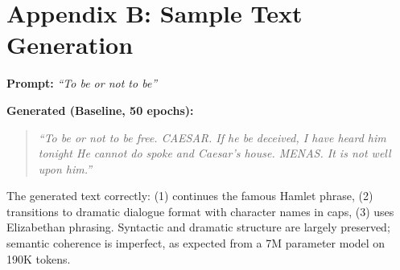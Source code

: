 \documentclass[12pt,a4paper]{article}
\begin{document}
\section*{Appendix B: Sample Text Generation}

\textbf{Prompt:} \textit{``To be or not to be''}

\textbf{Generated (Baseline, 50 epochs):}
\begin{quote}
\textit{``To be or not to be free. CAESAR. If he be deceived, I have heard him tonight He cannot do spoke and Caesar's house. MENAS. It is not well upon him.''}
\end{quote}

The generated text correctly: (1) continues the famous Hamlet phrase, (2) transitions to dramatic dialogue format with character names in caps, (3) uses Elizabethan phrasing. Syntactic and dramatic structure are largely preserved; semantic coherence is imperfect, as expected from a 7M parameter model on 190K tokens.
\end{document}
